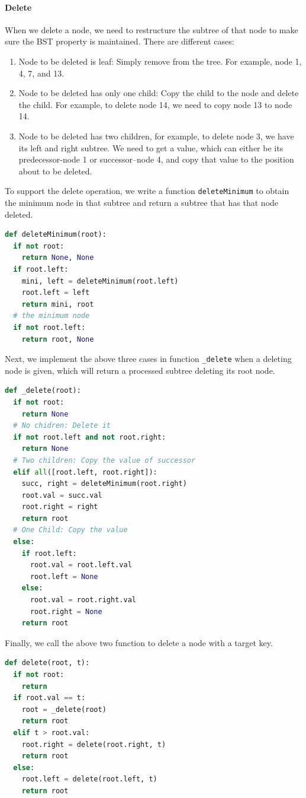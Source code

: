 \documentclass[main.tex]{subfiles}
\begin{document}
\paragraph{Delete} 
When we delete a node, we need to restructure the subtree of that node to make sure the BST property is maintained. There are different cases:
\begin{enumerate}
    \item Node to be deleted is leaf: Simply remove from the tree. For example, node 1, 4, 7, and 13.
    \item Node to be deleted has only one child: Copy the child to the node and delete the child. For example, to delete node 14, we need to copy node 13 to node 14. 
    \item Node to be deleted has two children, for example, to delete node 3, we have its left and right subtree. We need to get a value, which can either be its predecessor-node 1 or successor--node 4, and copy that value to the position about to be deleted. 
\end{enumerate}
To support the delete operation, we write a function \texttt{deleteMinimum} to obtain the minimum node in that subtree and return a subtree that has that node deleted.
\begin{lstlisting}[language=Python]
def deleteMinimum(root):
  if not root:
    return None, None
  if root.left:
    mini, left = deleteMinimum(root.left)
    root.left = left
    return mini, root
  # the minimum node
  if not root.left: 
    return root, None 
\end{lstlisting}
Next, we implement the above three cases in function \texttt{\_delete}  when a deleting node is given,  which will return a processed subtree deleting its root node. 
\begin{lstlisting}[language=Python]
def _delete(root):
  if not root:
    return None
  # No chidren: Delete it
  if not root.left and not root.right:
    return None 
  # Two children: Copy the value of successor
  elif all([root.left, root.right]):
    succ, right = deleteMinimum(root.right)
    root.val = succ.val
    root.right = right
    return root
  # One Child: Copy the value
  else:
    if root.left:
      root.val = root.left.val
      root.left = None
    else:
      root.val = root.right.val
      root.right = None
    return root
\end{lstlisting}
Finally, we call the above two function to delete a node with a target key.
\begin{lstlisting}[language=Python]
def delete(root, t):
  if not root:
    return
  if root.val == t:
    root = _delete(root)
    return root 
  elif t > root.val:
    root.right = delete(root.right, t)
    return root
  else:
    root.left = delete(root.left, t)
    return root
\end{lstlisting}
\end{document}

